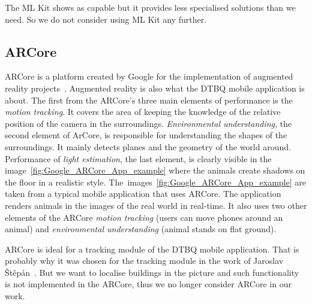 \documentclass[thesis=B,english]{FITthesis}[2019/12/23]
\begin{document}
            The ML Kit shows as capable but it provides less specialised solutions than we need. So we do not consider using ML Kit any further.
            
            \subsection{ARCore}
                ARCore is a platform created by Google for the implementation of augmented reality projects~\cite{Google_ARCore}. Augmented reality is also what the DTBQ mobile application is about. The first from the ARCore's three main elements of performance is the \textit{motion tracking}. It covers the area of keeping the knowledge of the relative position of the camera in the surroundings. \textit{Environmental understanding}, the second element of ArCore, is responsible for understanding the shapes of the surroundings. It mainly detects planes and the geometry of the world around. Performance of \textit{light estimation}, the last element, is clearly visible in the image~\ref{fig:Google_ARCore_App_example} where the animals create shadows on the floor in a realistic style. The~images~\ref{fig:Google_ARCore_App_example} are taken from a typical mobile application that uses ARCore. The application renders animals in the images of the real world in real-time. It also uses two other elements of the ARCore \textit{motion tracking} (users can move phones around an animal) and \textit{environmental understanding} (animal stands on flat ground).

                ARCore is ideal for a tracking module of the DTBQ mobile application. That is probably why it was chosen for the tracking module in the work of Jaroslav Štěpán~\cite{Stepan2019}. But we want to localise buildings in the picture and such functionality is not implemented in the ARCore, thus we no longer consider ARCore in our work.
                
\end{document}
